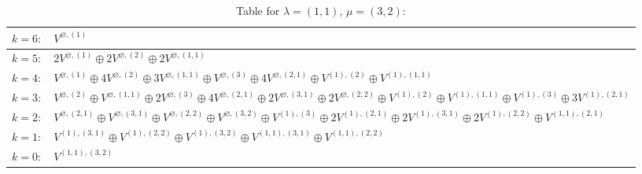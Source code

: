 \documentclass[a4paper,12pt]{article}
\begin{document}
\renewcommand{\arraystretch}{1.6} 
\begin{table}[H]
\centering
\caption{Table for $\lambda = (1, 1)$, $\mu = (3, 2)$:}
\begin{tabular}{|>{\centering\arraybackslash}p{15cm}|}
\hline
 $k = 6: \quad V^{\varnothing, (1)} $ \\ \hline
 $k = 5: \quad 2 V^{\varnothing, (1)} \oplus 2 V^{\varnothing, (2)} \oplus 2 V^{\varnothing, (1, 1)} $ \\ \hline
 $k = 4: \quad V^{\varnothing, (1)} \oplus 4 V^{\varnothing, (2)} \oplus 3 V^{\varnothing, (1, 1)} \oplus V^{\varnothing, (3)} \oplus 4 V^{\varnothing, (2, 1)} \oplus V^{(1), (2)} \oplus V^{(1), (1, 1)} $ \\ \hline
 $k = 3: \quad V^{\varnothing, (2)} \oplus V^{\varnothing, (1, 1)} \oplus 2 V^{\varnothing, (3)} \oplus 4 V^{\varnothing, (2, 1)} \oplus 2 V^{\varnothing, (3, 1)} \oplus 2 V^{\varnothing, (2, 2)} \oplus V^{(1), (2)} \oplus V^{(1), (1, 1)} \oplus V^{(1), (3)} \oplus 3 V^{(1), (2, 1)} $ \\ \hline
 $k = 2: \quad V^{\varnothing, (2, 1)} \oplus V^{\varnothing, (3, 1)} \oplus V^{\varnothing, (2, 2)} \oplus V^{\varnothing, (3, 2)} \oplus V^{(1), (3)} \oplus 2 V^{(1), (2, 1)} \oplus 2 V^{(1), (3, 1)} \oplus 2 V^{(1), (2, 2)} \oplus V^{(1, 1), (2, 1)} $ \\ \hline
 $k = 1: \quad V^{(1), (3, 1)} \oplus V^{(1), (2, 2)} \oplus V^{(1), (3, 2)} \oplus V^{(1, 1), (3, 1)} \oplus V^{(1, 1), (2, 2)} $ \\ \hline
 $k = 0: \quad V^{(1, 1), (3, 2)} $ \\ \hline
\end{tabular}
\end{table}
\end{document}
